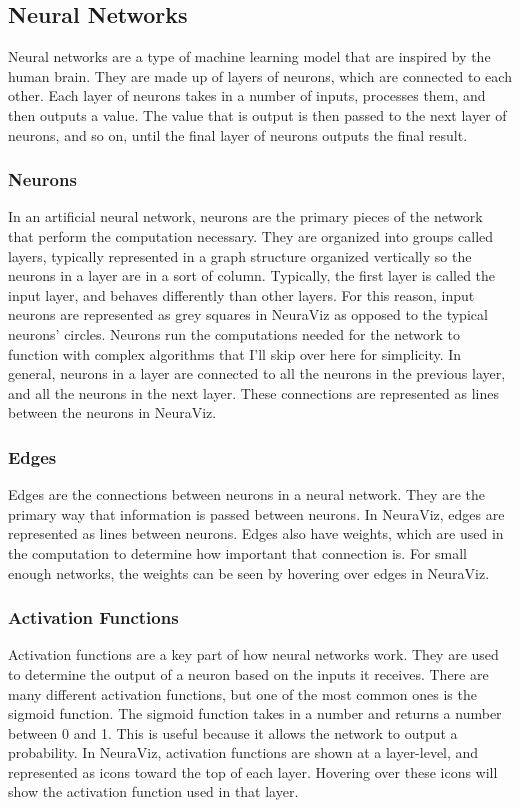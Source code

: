 \subsection{Neural Networks} \label{sec:neural_networks}
Neural networks are a type of machine learning model that are inspired by the human brain. They are made up of layers of neurons, which are connected to each other. Each layer of neurons takes in a number of inputs, processes them, and then outputs a value. The value that is output is then passed to the next layer of neurons, and so on, until the final layer of neurons outputs the final result. \cite{neuralnetworksanddeeplearning}

\subsubsection{Neurons}
In an artificial neural network, neurons are the primary pieces of the network that perform the computation necessary. They are organized into groups called layers, typically represented in a graph structure organized vertically so the neurons in a layer are in a sort of column. Typically, the first layer is called the input layer, and behaves differently than other layers. For this reason, input neurons are represented as grey squares in NeuraViz as opposed to the typical neurons' circles. Neurons run the computations needed for the network to function with complex algorithms that I'll skip over here for simplicity. In general, neurons in a layer are connected to all the neurons in the previous layer, and all the neurons in the next layer. These connections are represented as lines between the neurons in NeuraViz.

\subsubsection{Edges}
Edges are the connections between neurons in a neural network. They are the primary way that information is passed between neurons. In NeuraViz, edges are represented as lines between neurons. Edges also have weights, which are used in the computation to determine how important that connection is. For small enough networks, the weights can be seen by hovering over edges in NeuraViz.

\subsubsection{Activation Functions}
Activation functions are a key part of how neural networks work. They are used to determine the output of a neuron based on the inputs it receives. There are many different activation functions, but one of the most common ones is the sigmoid function. The sigmoid function takes in a number and returns a number between 0 and 1. This is useful because it allows the network to output a probability. In NeuraViz, activation functions are shown at a layer-level, and represented as icons toward the top of each layer. Hovering over these icons will show the activation function used in that layer.
